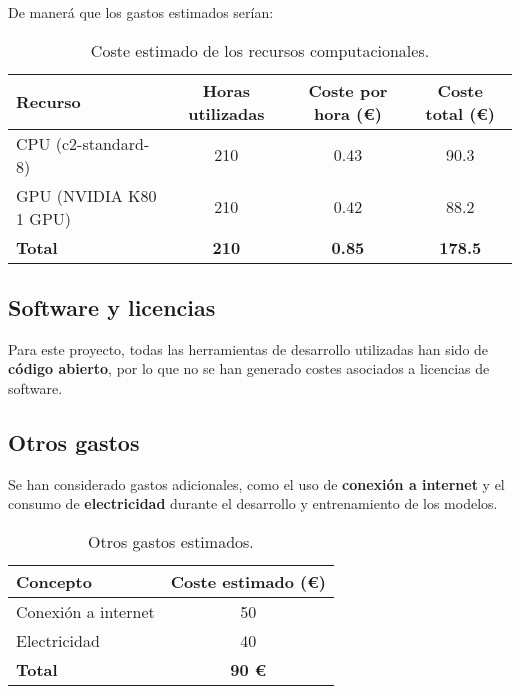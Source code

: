 De manerá que los gastos estimados serían:
\begin{table}[htp]\label{tab:recursos-computacionales}
    \centering
    \begin{adjustbox}{width=\linewidth}
        \begin{tabular}{|l|c|c|c|}
            \hline
            \textbf{Recurso} & \textbf{Horas utilizadas} & \textbf{Coste por hora (€)} & \textbf{Coste total (€)} \\ \hline
            CPU (c2-standard-8) & 210 & 0.43 & 90.3 \\
            GPU (NVIDIA K80 1 GPU) & 210 & 0.42 & 88.2 \\ \hline
            \textbf{Total} & \textbf{210} & \textbf{0.85} & \textbf{178.5} \\ \hline
        \end{tabular}
    \end{adjustbox}
    \caption{Coste estimado de los recursos computacionales.}
\end{table}


\subsection{Software y licencias}\label{subsec:software-y-licencias}
Para este proyecto, todas las herramientas de desarrollo utilizadas han sido de \textbf{código abierto}, por lo que no
se han generado costes asociados a licencias de software.

\subsection{Otros gastos}\label{subsec:otros-gastos}
Se han considerado gastos adicionales, como el uso de \textbf{conexión a internet} y el consumo de
\textbf{electricidad} durante el desarrollo y entrenamiento de los modelos.

\begin{table}[htp]\label{tab:otros-gastos}
    \centering
    \begin{tabular}{|l|c|}
        \hline
        \textbf{Concepto} & \textbf{Coste estimado (€)} \\ \hline
        Conexión a internet & 50 \\
        Electricidad & 40 \\ \hline
        \textbf{Total} & \textbf{90 €} \\ \hline
    \end{tabular}
    \caption{Otros gastos estimados.}
\end{table}


